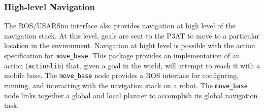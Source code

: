 \subsubsection*{High-level Navigation}
The ROS/USARSim interface also provides navigation at high level of the navigation stack. At this level, goals are sent to the P3AT to move to a particular location in the environment. Navigation at hight level is possible with the action specification for \texttt{move\_base}. This package provides an implementation of an action (\texttt{actionlib}) that, given a goal in the world, will attempt to reach it with a mobile base. The \texttt{move\_base} node provides a ROS interface for configuring, running, and interacting with the navigation stack on a robot. The \texttt{move\_base} node links together a global and local planner to accomplish its global navigation task.



